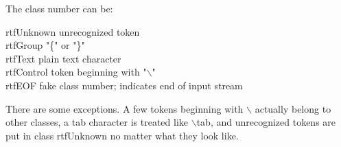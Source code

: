 \documentclass{article}
\begin{document}
\noindent
The class number can be:






\noindent
rtfUnknown	unrecognized token\\
rtfGroup	"\{" or "\}"\\
rtfText	plain text character\\
rtfControl	token beginning with "$\backslash $"\\
rtfEOF	fake class number; indicates end of input stream






\noindent
There are some exceptions. A few tokens beginning with $\backslash $ actually 
belong to other classes, a tab character is treated like $\backslash $tab, and 
unrecognized tokens are put in class rtfUnknown no matter what they look 
like.
\end{document}

